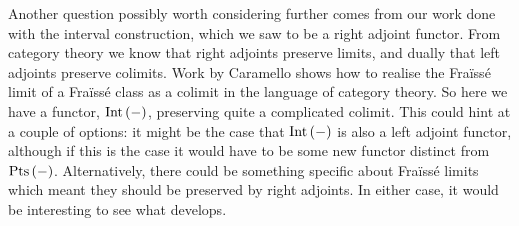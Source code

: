 Another question possibly worth considering further comes from our work done with the interval
construction, which we saw to be a right adjoint functor. From category theory we know that
right adjoints preserve limits, and dually that left adjoints preserve colimits. Work by
Caramello \cite{caramello08} shows how to realise the Fraïssé limit of a Fraïssé class as a
colimit in the language of category theory. So here we have a functor, $\text{Int}\left(-\right)$, preserving quite
a complicated colimit. This could hint at a couple of options: it might be the case that $\text{Int}\left(-\right)$ is
also a left adjoint functor, although if this is the case it would have to be some new functor
distinct from $\text{Pts}\left(-\right)$. Alternatively, there could be something specific about Fraïssé limits
which meant they should be preserved by right adjoints. In either case, it would be interesting to
see what develops.
